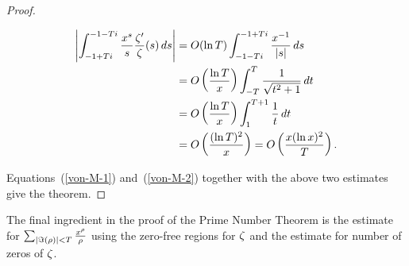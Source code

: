 \begin{proof}
\begin{enumerate}
\begin{align*}
\left| {\int_{-1+Ti}^{-1-Ti}
\frac{x^s}{s}\frac{\zeta'}{\zeta}(s)\,ds} \right|
&=
O(\ln T )
\int_{-1-Ti}^{-1+Ti} \frac{x^{-1}}{|s|}\,ds
\\
&=
O\left( {\frac{\ln T  }{x}} \right)
\int_{-T}^{T} \frac{1}{\sqrt{t^2+1}}\,dt\\
&=
O\left( {\frac{\ln T  }{x}} \right)
\int_{1}^{T+1} \frac{1}{t}\,dt\\
&=
O\left( {\frac{(\ln T )^2}{x}} \right)=O\left( {\frac{x(\ln x)^2}{T}} \right).
\end{align*}
\end{enumerate}
Equations~(\ref{von-M-1}) and~(\ref{von-M-2}) together with the above two estimates give the theorem.
\end{proof}
The final ingredient in the proof of the Prime Number Theorem is the estimate for $\sum_{|\Im(\rho)|<T}\frac{x^{\rho}}{\rho}$ using the zero-free regions for $\zeta$ and the estimate for number of zeros of $\zeta$.
